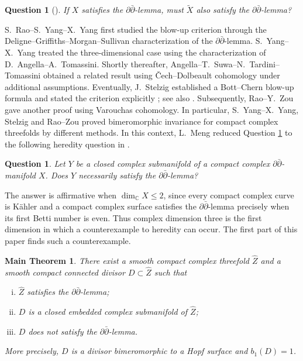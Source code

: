 \documentclass[11pt]{amsart}
\numberwithin{equation}{section}
\def\mb{\mathbb}
\theoremstyle{plain}
\newtheorem{mthm}[thm]{Main Theorem}
\newtheorem{quest}[thm]{Question}
\theoremstyle{definition}
\begin{document}
\begin{quest}[{\cite[\S~1]{Al17}}]\label{quest-modification}
If $X$ satisfies the $\partial\bar\partial$-lemma, must $\tilde{X}$ also satisfy the
$\partial\bar\partial$-lemma?
\end{quest}

S.~Rao--S.~Yang--X.~Yang
\cite[Theorem 1.6]{RYY19}\cite[Theorem 1.2]{RYY20} first studied the blow-up
criterion through the Deligne--Griffiths--Morgan--Sullivan characterization
of the $\partial\bar\partial$-lemma.  S.~Yang--X.~Yang
\cite[Theorem 1.3]{YY20} treated the three-dimensional case using the
characterization of D.~Angella--A.~Tomassini.  Shortly thereafter,
Angella--T.~Suwa--N.~Tardini--Tomassini
\cite[Theorem 13]{ASTT20} obtained a related result using
\v{C}ech--Dolbeault cohomology under additional assumptions.  Eventually,
J.~Stelzig established a Bott--Chern blow-up
formula and stated the criterion explicitly \cite[Corollary 1.40]{Se18}; see also \cite[\S~5]{Se21}.
Subsequently, Rao--Y.~Zou \cite[Corollary 5.4]{RZ24} gave another proof
using Varouchas cohomology.  In particular, S.~Yang--X.~Yang, Stelzig and Rao--Zou proved
bimeromorphic invariance for compact complex threefolds by different
methods. In this context,  L.~Meng reduced Question \ref{quest-modification} to the following heredity
question in \cite[Question 1]{Mn21}.

\begin{quest}\label{quest-heredity}
Let $Y$ be a closed complex submanifold of a compact complex
$\partial\bar\partial$-manifold $X$.  Does $Y$ necessarily satisfy the
$\partial\bar\partial$-lemma?
\end{quest}

The answer is affirmative when $\dim_{\mb C}X\leq2$, since every compact
complex curve is K\"ahler and a compact complex surface satisfies the
$\partial\bar\partial$-lemma precisely when its first Betti number is even.
Thus complex dimension three is the first dimension in which a counterexample
to heredity can occur.  The first part of this paper finds such a
counterexample.

\begin{mthm}\label{main-thm}
There exist a smooth compact complex threefold $\widehat Z$ and a smooth
compact connected divisor $D\subset\widehat Z$ such that
\begin{enumerate}[(i)]
\item $\widehat Z$ satisfies the $\partial\bar\partial$-lemma;
\item $D$ is a closed embedded complex submanifold of $\widehat Z$;
\item $D$ does not satisfy the $\partial\bar\partial$-lemma.
\end{enumerate}
More precisely, $D$ is a divisor bimeromorphic to a Hopf surface and
$b_1(D)=1$.
\end{mthm}
\end{document}
